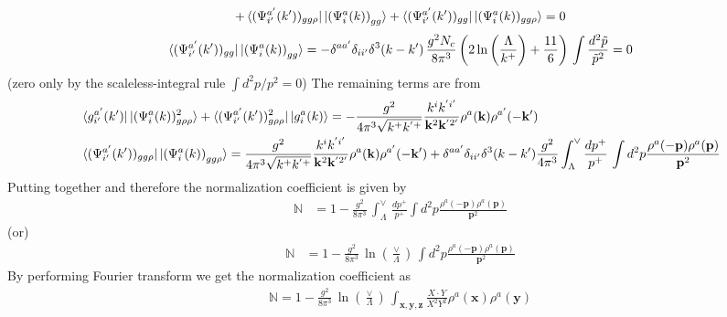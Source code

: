 \documentclass[aps,prd,amsmath,amssymb,nofootinbib]{revtex4-2}
\def\mf#1{\mathbb{#1}}
\def\v#1{\mathbf{#1}}
\numberwithin{equation}{section}
\begin{document}
$$+\bra{(\Psi^{a'}_{i'}(k'))_{gg\rho} }\ket{ \left(\Psi^{a}_{i}(k) \right)_{gg} } + \bra{(\Psi^{a'}_{i'}(k'))_{gg} }\ket{(\Psi^{a}_{i}(k))_{gg\rho} } = 0 $$ 
$$\bra{(\Psi^{a'}_{i'}(k'))_{gg} }\ket{ \left(\Psi^{a}_{i}(k) \right)_{gg} } = -\delta^{aa'}\delta_{ii'}\delta^{3}(k-k')\,\frac{g^2N_c}{8\pi^3} \left(  2 \ln \bigg(\frac{\Lambda}{k^{+}} \bigg) + \frac{11}{6}  \right) \,\int \frac{d^2\tilde p}{\tilde p^2} = 0 $$ (zero only by the scaleless-integral rule $\int d^{2}p/p^{2}=0$)
The remaining terms are from
\begin{align}
   & \bra{g^{a'}_{i'}(k')}\ket{(\Psi^{a}_{i}(k))^{2}_{g\rho\rho} } + \bra{(\Psi^{a'}_{i'}(k'))^{2}_{g\rho\rho} }\ket{g^{a}_{i}(k)}  = -\frac{g^2}{4 \pi^3 \sqrt{k^+ k^{'+}}} \frac{k^{i} k^{'i'}}{\v{k}^2\v{k}^{'2'}} \rho^a (\v{k})\rho^{a'} (-\v{k}') \notag \\ & \bra{(\Psi^{a'}_{i'}(k'))_{gg\rho} }\ket{ \left(\Psi^{a}_{i}(k) \right)_{gg\rho} } = \frac{g^2}{4 \pi^3 \sqrt{k^+ k^{'+}}} \frac{k^{i} k^{'i'}}{\v{k}^2\v{k}^{'2'}}\rho^a (\v{k}) \rho^{a'} (-\v{k}')+ 
 \delta^{a a'} \delta_{i i'}  \delta^3(k-k')  
  \frac{g^2}{4 \pi^3 } \int_{\Lambda}^{\vee} \frac{dp^{+}}{p^{+}}\,
  \int d^2p \frac{\rho^a(-\v{p}) \rho^a(\v{p})}{\v{p}^2} \nonumber
\end{align}
Putting together and therefore the normalization coefficient is given by 
\begin{align}
\mf{N} & =  
 1 - \frac{g^2}{8 \pi^3 }\, \int_{\Lambda}^{\vee}\,\frac{dp^{+}}{p^{+}}
\int d^2p \frac{\rho^a(-\v{p}) \rho^a(\v{p})}{\v{p}^2}
\end{align}
(or)
\begin{align}
\mf{N} & =  
 1 - \frac{g^2}{8 \pi^3 }\,\ln\left(\frac{\vee}{\Lambda}\right)\,
\int d^2p \frac{\rho^a(-\v{p}) \rho^a(\v{p})}{\v{p}^2}
\end{align}
By performing Fourier transform we get the normalization coefficient as
\begin{align}
\mf{N} =  
 1 - \frac{g^2}{8 \pi^3 }\,\ln\left(\frac{\vee}{\Lambda}\right)\, 
  \int_{\v{x}, \v{y},\v{z}} \frac{X\cdot Y}{X^2 Y^2}   \rho^a(\v{x}) \rho^a(\v{y})
\end{align}
\newpage
\end{document}
